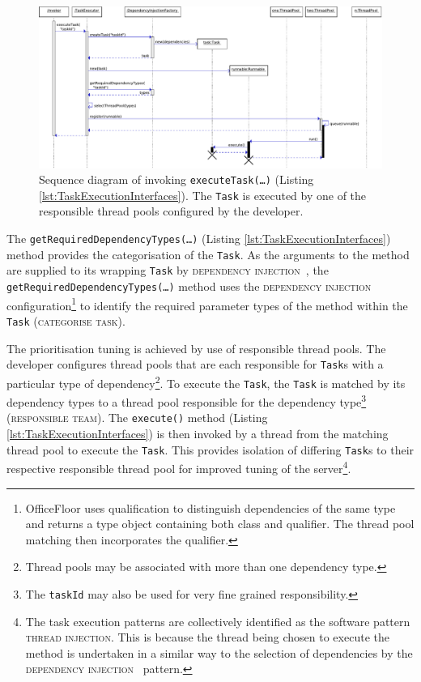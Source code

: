 \documentclass[prodmode]{style/acmlarge}
\begin{document}
\begin{figure}[!t]
\centering
\includegraphics[width=6in]{ExecuteComponentSequenceDiagram}
\caption{Sequence diagram of invoking \texttt{executeTask(\ldots)} (Listing \ref{lst:TaskExecutionInterfaces}).  The \texttt{Task} is executed by one of the responsible thread pools configured by the developer.}
\label{fig:ExecuteComponentSequenceDiagram}
\end{figure}

The \texttt{getRequiredDependencyTypes(\ldots)} (Listing
\ref{lst:TaskExecutionInterfaces}) method provides the categorisation of the
\texttt{Task}.  As the arguments to the method are supplied to its wrapping
\texttt{Task} by \textsc{dependency injection}~\cite{ioc}, the
\texttt{getRequiredDependencyTypes(\ldots)} method uses the \textsc{dependency
injection} configuration\footnote{OfficeFloor uses qualification to distinguish
dependencies of the same type and returns a type object containing both class
and qualifier.  The thread pool matching then incorporates the qualifier.} to
identify the required parameter types of the method within the \texttt{Task}
(\textsc{categorise task}).

The prioritisation tuning is achieved by use of responsible thread pools.  The
developer configures thread pools that are each responsible for \texttt{Task}s
with a particular type of dependency\footnote{Thread pools may be associated
with more than one dependency type.}.  To execute the \texttt{Task}, the
\texttt{Task} is matched by its dependency types to a thread pool responsible
for the dependency type\footnote{The \texttt{taskId} may also be used for very
fine grained responsibility.} (\textsc{responsible team}).  The
\texttt{execute()} method (Listing \ref{lst:TaskExecutionInterfaces}) is then
invoked by a thread from the matching thread pool to execute the \texttt{Task}.
This provides isolation of differing \texttt{Task}s to their respective
responsible thread pool for improved tuning of the server\footnote{The task
execution patterns are collectively identified as the software pattern
\textsc{thread injection}.  This is because the thread being chosen to execute
the method is undertaken in a similar way to the selection of dependencies by
the \textsc{dependency injection}~\cite{ioc} pattern.}.
\end{document}
